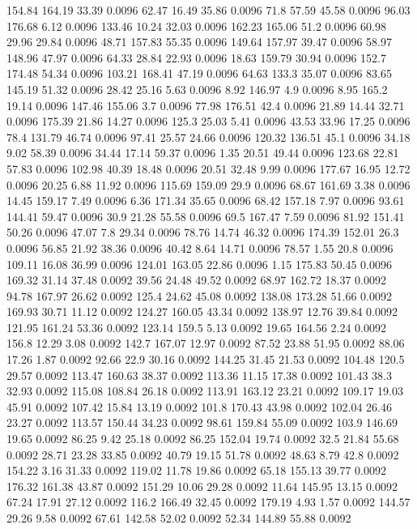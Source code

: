 154.84	164.19	33.39	0.0096
62.47	16.49	35.86	0.0096
71.8	57.59	45.58	0.0096
96.03	176.68	6.12	0.0096
133.46	10.24	32.03	0.0096
162.23	165.06	51.2	0.0096
60.98	29.96	29.84	0.0096
48.71	157.83	55.35	0.0096
149.64	157.97	39.47	0.0096
58.97	148.96	47.97	0.0096
64.33	28.84	22.93	0.0096
18.63	159.79	30.94	0.0096
152.7	174.48	54.34	0.0096
103.21	168.41	47.19	0.0096
64.63	133.3	35.07	0.0096
83.65	145.19	51.32	0.0096
28.42	25.16	5.63	0.0096
8.92	146.97	4.9	0.0096
8.95	165.2	19.14	0.0096
147.46	155.06	3.7	0.0096
77.98	176.51	42.4	0.0096
21.89	14.44	32.71	0.0096
175.39	21.86	14.27	0.0096
125.3	25.03	5.41	0.0096
43.53	33.96	17.25	0.0096
78.4	131.79	46.74	0.0096
97.41	25.57	24.66	0.0096
120.32	136.51	45.1	0.0096
34.18	9.02	58.39	0.0096
34.44	17.14	59.37	0.0096
1.35	20.51	49.44	0.0096
123.68	22.81	57.83	0.0096
102.98	40.39	18.48	0.0096
20.51	32.48	9.99	0.0096
177.67	16.95	12.72	0.0096
20.25	6.88	11.92	0.0096
115.69	159.09	29.9	0.0096
68.67	161.69	3.38	0.0096
14.45	159.17	7.49	0.0096
6.36	171.34	35.65	0.0096
68.42	157.18	7.97	0.0096
93.61	144.41	59.47	0.0096
30.9	21.28	55.58	0.0096
69.5	167.47	7.59	0.0096
81.92	151.41	50.26	0.0096
47.07	7.8	29.34	0.0096
78.76	14.74	46.32	0.0096
174.39	152.01	26.3	0.0096
56.85	21.92	38.36	0.0096
40.42	8.64	14.71	0.0096
78.57	1.55	20.8	0.0096
109.11	16.08	36.99	0.0096
124.01	163.05	22.86	0.0096
1.15	175.83	50.45	0.0096
169.32	31.14	37.48	0.0092
39.56	24.48	49.52	0.0092
68.97	162.72	18.37	0.0092
94.78	167.97	26.62	0.0092
125.4	24.62	45.08	0.0092
138.08	173.28	51.66	0.0092
169.93	30.71	11.12	0.0092
124.27	160.05	43.34	0.0092
138.97	12.76	39.84	0.0092
121.95	161.24	53.36	0.0092
123.14	159.5	5.13	0.0092
19.65	164.56	2.24	0.0092
156.8	12.29	3.08	0.0092
142.7	167.07	12.97	0.0092
87.52	23.88	51.95	0.0092
88.06	17.26	1.87	0.0092
92.66	22.9	30.16	0.0092
144.25	31.45	21.53	0.0092
104.48	120.5	29.57	0.0092
113.47	160.63	38.37	0.0092
113.36	11.15	17.38	0.0092
101.43	38.3	32.93	0.0092
115.08	108.84	26.18	0.0092
113.91	163.12	23.21	0.0092
109.17	19.03	45.91	0.0092
107.42	15.84	13.19	0.0092
101.8	170.43	43.98	0.0092
102.04	26.46	23.27	0.0092
113.57	150.44	34.23	0.0092
98.61	159.84	55.09	0.0092
103.9	146.69	19.65	0.0092
86.25	9.42	25.18	0.0092
86.25	152.04	19.74	0.0092
32.5	21.84	55.68	0.0092
28.71	23.28	33.85	0.0092
40.79	19.15	51.78	0.0092
48.63	8.79	42.8	0.0092
154.22	3.16	31.33	0.0092
119.02	11.78	19.86	0.0092
65.18	155.13	39.77	0.0092
176.32	161.38	43.87	0.0092
151.29	10.06	29.28	0.0092
11.64	145.95	13.15	0.0092
67.24	17.91	27.12	0.0092
116.2	166.49	32.45	0.0092
179.19	4.93	1.57	0.0092
144.57	29.26	9.58	0.0092
67.61	142.58	52.02	0.0092
52.34	144.89	55.88	0.0092
